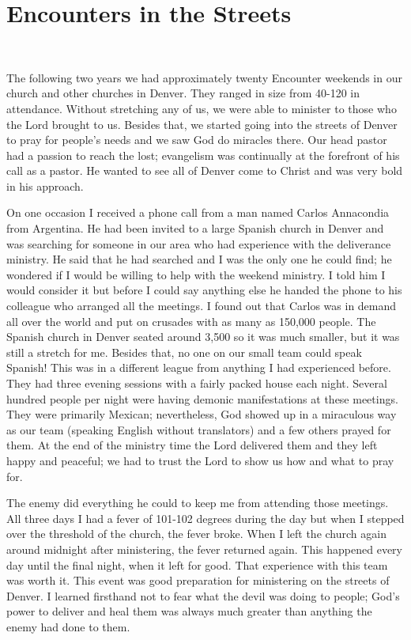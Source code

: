 \documentclass[oneside]{book}
\begin{document}
\section{Encounters in the Streets}
\

The following two years we had approximately twenty Encounter weekends in our church and other churches in Denver. They ranged in size from 40-120 in attendance. Without stretching any of us, we were able to minister to those who the Lord brought to us. Besides that, we started going into the streets of Denver to pray for people's needs and we saw God do miracles there. Our head pastor had a passion to reach the lost; evangelism was continually at the forefront of his call as a pastor. He wanted to see all of Denver come to Christ and was very bold in his approach. 

On one occasion I received a phone call from a man named Carlos Annacondia from Argentina. He had been invited to a large Spanish church in Denver and was searching for someone in our area who had experience with the deliverance ministry. He said that he had searched and I was the only one he could find; he wondered if I would be willing to help with the weekend ministry. I told him I would consider it but before I could say anything else he handed the phone to his colleague who arranged all the meetings. I found out that Carlos was in demand all over the world and put on crusades with as many as 150,000 people. The Spanish church in Denver seated around 3,500 so it was much smaller, but it was still a stretch for me. Besides that, no one on our small team could speak Spanish! This was in a different league from anything I had experienced before. They had three evening sessions with a fairly packed house each night. Several hundred people per night were having demonic manifestations at these meetings. They were primarily Mexican; nevertheless, God showed up in a miraculous way as our team (speaking English without translators) and a few others prayed for them. At the end of the ministry time the Lord delivered them and they left happy and peaceful; we had to trust the Lord to show us how and what to pray for. 

The enemy did everything he could to keep me from attending those meetings. All three days I had a fever of 101-102 degrees during the day but when I stepped over the threshold of the church, the fever broke. When I left the church again around midnight after ministering, the fever returned again. This happened every day until the final night, when it left for good. That experience with this team was worth it. This event was good preparation for ministering on the streets of Denver. I learned firsthand not to fear what the devil was doing to people; God's power to deliver and heal them was always much greater than anything the enemy had done to them. 
\end{document}
